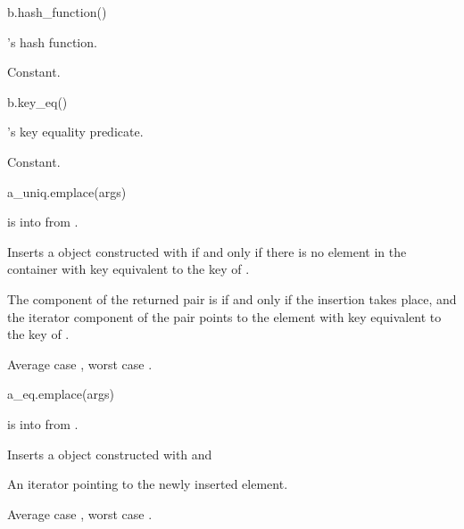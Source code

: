 %
\begin{itemdecl}
b.hash_function()
\end{itemdecl}

\begin{itemdescr}
\pnum
\result
{}

\pnum
\returns
{}'s hash function.

\pnum
\complexity
Constant.
\end{itemdescr}

%
\begin{itemdecl}
b.key_eq()
\end{itemdecl}

\begin{itemdescr}
\pnum
\result
{}

\pnum
\returns
{}'s key equality predicate.

\pnum
\complexity
Constant.
\end{itemdescr}

%
\begin{itemdecl}
a_uniq.emplace(args)
\end{itemdecl}

\begin{itemdescr}
\pnum
\result
{} 

\pnum
\expects
{} is
 into  from .

\pnum
\effects
Inserts a  object 
constructed with  if and only if
there is no element in the container
with key equivalent to the key of .

\pnum
\returns
The  component of the returned pair is 
if and only if the insertion takes place, and
the iterator component of the pair points to
the element with key equivalent to the key of .

\pnum
\complexity
Average case , worst case .
\end{itemdescr}

%
\begin{itemdecl}
a_eq.emplace(args)
\end{itemdecl}

\begin{itemdescr}
\pnum
\result
{}

\pnum
\expects
{} is
 into  from .

\pnum
\effects
Inserts a  object 
constructed with  and

\pnum
\returns
An iterator pointing to the newly inserted element.

\pnum
\complexity
Average case , worst case .
\end{itemdescr}

